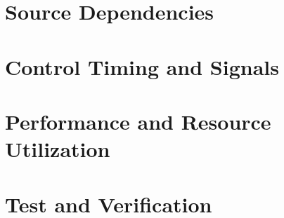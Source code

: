 
\section*{Source Dependencies}

\begin{landscape}



\end{landscape}

\section*{Control Timing and Signals}
\begin{flushleft}
\end{flushleft}

\section*{Performance and Resource Utilization}

\section*{Test and Verification}
\begin{flushleft}
\end{flushleft}
